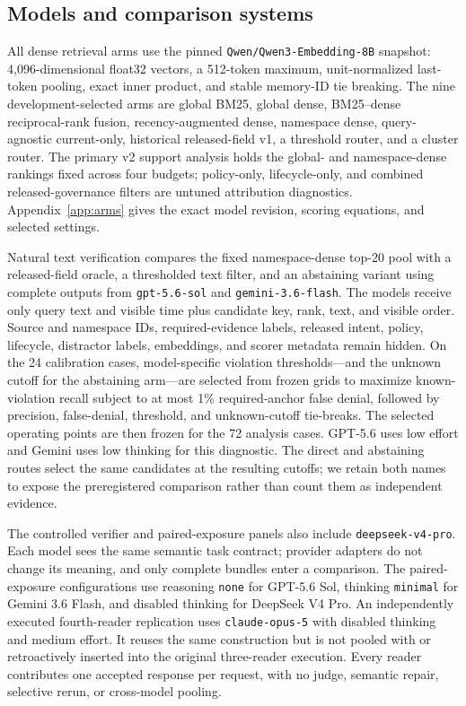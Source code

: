 \documentclass{article}
\begin{document}
\subsection{Models and comparison systems}

All dense retrieval arms use the pinned \texttt{Qwen/Qwen3-Embedding-8B} snapshot:
4,096-dimensional float32 vectors, a 512-token maximum, unit-normalized last-token
pooling, exact inner product, and stable memory-ID tie breaking.  The nine
development-selected arms are global BM25, global dense, BM25--dense reciprocal-rank
fusion, recency-augmented dense, namespace dense, query-agnostic current-only,
historical released-field v1, a threshold router, and a cluster router.  The primary
v2 support analysis holds the global- and namespace-dense rankings fixed across four
budgets; policy-only, lifecycle-only, and combined released-governance filters are
untuned attribution diagnostics.  Appendix~\ref{app:arms} gives the exact model
revision, scoring equations, and selected settings.

Natural text verification compares the fixed namespace-dense top-20 pool with a
released-field oracle, a thresholded text filter, and an abstaining variant using
complete outputs from \texttt{gpt-5.6-sol} and \texttt{gemini-3.6-flash}.  The
models receive only query text and visible time plus candidate key, rank, text, and
visible order.  Source and namespace IDs, required-evidence labels, released intent,
policy, lifecycle, distractor labels, embeddings, and scorer metadata remain hidden.
On the 24 calibration cases, model-specific violation thresholds---and the unknown
cutoff for the abstaining arm---are selected from frozen grids to maximize known-
violation recall subject to at most 1\% required-anchor false denial, followed by
precision, false-denial, threshold, and unknown-cutoff tie-breaks.  The selected
operating points are then frozen for the 72 analysis cases.  GPT-5.6 uses low effort
and Gemini uses low thinking for this diagnostic.  The direct and abstaining routes
select the same candidates at the resulting cutoffs; we retain both names to expose
the preregistered comparison rather than count them as independent evidence.

The controlled verifier and paired-exposure panels also include
\texttt{deepseek-v4-pro}.  Each model sees the same semantic task contract; provider
adapters do not change its meaning, and only complete bundles enter a comparison.
The paired-exposure configurations use reasoning \texttt{none} for GPT-5.6 Sol,
thinking \texttt{minimal} for Gemini 3.6 Flash, and disabled thinking for DeepSeek V4
Pro.  An independently executed fourth-reader replication uses
\texttt{claude-opus-5} with disabled thinking and medium effort.  It reuses the same
construction but is not pooled with or retroactively inserted into the original
three-reader execution.  Every reader contributes one accepted response per request,
with no judge, semantic repair, selective rerun, or cross-model pooling.
\end{document}
